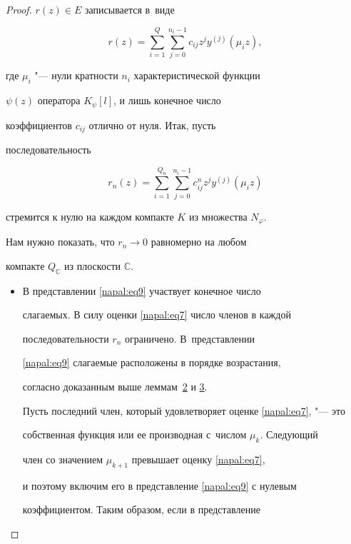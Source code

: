 \begin{proof}
$r(z)\in E $ записывается в~виде

$$

r(z)=\sum\limits_{i=1}^Q\sum\limits_{j=0}^{n_i-1} c_{ij} z^j y^{(j)}(\mu_i z) ,

$$

где $\mu_i$ "--- нули кратности $n_i$ характеристической функции

$\psi(z)$ оператора $K_\psi[l]$, и лишь конечное число

коэффициентов $c_{ij}$ отлично от нуля. Итак, пусть

последовательность

\begin{equation}

\label{napal:eq9}

r_n(z)=\sum\limits_{i=1}^{Q_n}\sum\limits_{j=0}^{n_i-1} c_{ij}^n

z^j y^{(j)}(\mu_i z)

\end{equation}

стремится к нулю на каждом компакте $K$ из  множества $N_\varphi$.

Нам нужно показать, что $r_n\to 0$ равномерно на любом

компакте $Q_\mathbb{C}$ из плоскости $\mathbb{C}$.



\begin{itemize}



\item[1.] В представлении \eqref{napal:eq9} участвует конечное число

слагаемых. В силу оценки \eqref{napal:eq7} число членов в каждой

последовательности $r_n$ ограничено. В~представлении

\eqref{napal:eq9} слагаемые расположены в порядке возрастания,

согласно доказанным выше леммам~\hyperlink{napalk:lemma2}{2} и \hyperlink{napalk:lemma3}{3}. 

Пусть последний член, который удовлетворяет оценке \eqref{napal:eq7}, "--- это

собственная функция или ее производная с~числом $\mu_k$. Следующий

член со значением $\mu_{k+1}$ превышает оценку \eqref{napal:eq7},

и поэтому включим его в представление \eqref{napal:eq9} с нулевым

коэффициентом. Таким образом, если в представление


\end{itemize}
\end{proof}
